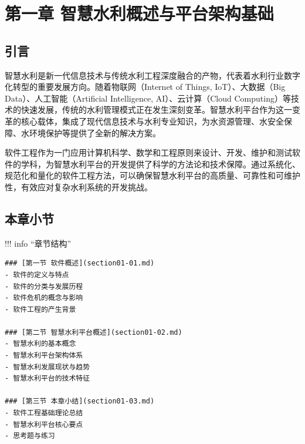 \hypertarget{ux7b2cux4e00ux7ae0-ux667aux6167ux6c34ux5229ux6982ux8ff0ux4e0eux5e73ux53f0ux67b6ux6784ux57faux7840}{%
\section{第一章 智慧水利概述与平台架构基础}\label{ux7b2cux4e00ux7ae0-ux667aux6167ux6c34ux5229ux6982ux8ff0ux4e0eux5e73ux53f0ux67b6ux6784ux57faux7840}}


\hypertarget{ux5f15ux8a00}{%
\subsection{引言}\label{ux5f15ux8a00}}

智慧水利是新一代信息技术与传统水利工程深度融合的产物，代表着水利行业数字化转型的重要发展方向。随着物联网（Internet of Things, IoT）、大数据（Big Data）、人工智能（Artificial Intelligence, AI）、云计算（Cloud Computing）等技术的快速发展，传统的水利管理模式正在发生深刻变革。智慧水利平台作为这一变革的核心载体，集成了现代信息技术与水利专业知识，为水资源管理、水安全保障、水环境保护等提供了全新的解决方案。

软件工程作为一门应用计算机科学、数学和工程原则来设计、开发、维护和测试软件的学科，为智慧水利平台的开发提供了科学的方法论和技术保障。通过系统化、规范化和量化的软件工程方法，可以确保智慧水利平台的高质量、可靠性和可维护性，有效应对复杂水利系统的开发挑战。

\hypertarget{ux672cux7ae0ux5c0fux8282}{%
\subsection{本章小节}\label{ux672cux7ae0ux5c0fux8282}}

!!! info ``章节结构''

\begin{verbatim}
### [第一节 软件概述](section01-01.md)
- 软件的定义与特点
- 软件的分类与发展历程
- 软件危机的概念与影响
- 软件工程的产生背景

### [第二节 智慧水利平台概述](section01-02.md)
- 智慧水利的基本概念
- 智慧水利平台架构体系
- 智慧水利发展现状与趋势
- 智慧水利平台的技术特征

### [第三节 本章小结](section01-03.md)
- 软件工程基础理论总结
- 智慧水利平台核心要点
- 思考题与练习
\end{verbatim}

